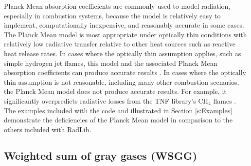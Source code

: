 \documentclass[preprint,12pt]{elsarticle}
\begin{document}
Planck Mean absorption coefficients are commonly used to model radiation, especially in combustion systems, because the model is relatively easy to implement, computationally inexpensive, and reasonably accurate in some cases. The Planck Mean model is most appropriate under optically thin conditions with relatively low radiative transfer relative to other heat sources such as reactive heat release rates. In cases where the optically thin assumption applies, such as simple hydrogen jet flames, this model and the associated Planck Mean absorption coefficients can produce accurate results \citep{Barlow_1999}. In cases where the optically thin assumption is not reasonable, including many other combustion scenarios, the Planck Mean model does not produce accurate results. For example, it significantly overpredicts radiative losses from the TNF library's CH$_4$ flames \cite{Frank_2000,Zhu_2002,Coelho_2002}. The examples included with the code and illustrated in Section \ref{s:Examples} demonstrate the deficiencies of the Planck Mean model in comparison to the others included with RadLib.


\subsection{Weighted sum of gray gases (WSGG)} \label{s:wsgg}
\end{document}
